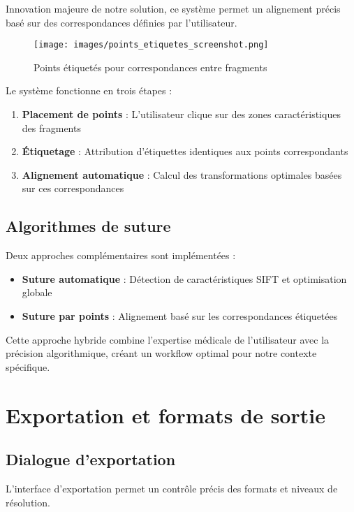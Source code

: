\documentclass[11pt,a4paper]{report}
\begin{document}
Innovation majeure de notre solution, ce système permet un alignement précis basé sur des correspondances définies par l'utilisateur.

\begin{figure}[htbp]
\centering
\texttt{[image: images/points\_etiquetes\_screenshot.png]}
\caption{Points étiquetés pour correspondances entre fragments}
\end{figure}

Le système fonctionne en trois étapes :
\begin{enumerate}
\item \textbf{Placement de points} : L'utilisateur clique sur des zones caractéristiques des fragments
\item \textbf{Étiquetage} : Attribution d'étiquettes identiques aux points correspondants
\item \textbf{Alignement automatique} : Calcul des transformations optimales basées sur ces correspondances
\end{enumerate}

\subsection{Algorithmes de suture}

Deux approches complémentaires sont implémentées :

\begin{itemize}
\item \textbf{Suture automatique} : Détection de caractéristiques SIFT et optimisation globale
\item \textbf{Suture par points} : Alignement basé sur les correspondances étiquetées
\end{itemize}

Cette approche hybride combine l'expertise médicale de l'utilisateur avec la précision algorithmique, créant un workflow optimal pour notre contexte spécifique.

\section{Exportation et formats de sortie}

\subsection{Dialogue d'exportation}

L'interface d'exportation permet un contrôle précis des formats et niveaux de résolution.
\end{document}
